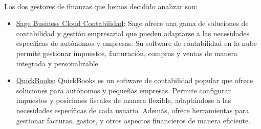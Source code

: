 \paragraph{}
Los dos gestores de finanzas que hemos decidido analizar son: 

\begin{itemize}
    \item \href{https://www.sage.com/es-es/software-contabilidad/}{Sage Business Cloud Contabilidad}: Sage ofrece una gama de soluciones de contabilidad y gestión empresarial que pueden adaptarse a las necesidades específicas de autónomos y empresas. Su software de contabilidad en la nube permite gestionar impuestos, facturación, compras y ventas de manera integrada y personalizable.

    \item \href{https://quickbooks.intuit.com/es/}{QuickBooks}: QuickBooks es un software de contabilidad popular que ofrece soluciones para autónomos y pequeñas empresas. Permite configurar impuestos y posiciones fiscales de manera flexible, adaptándose a las necesidades específicas de cada usuario. Además, ofrece herramientas para gestionar facturas, gastos, y otros aspectos financieros de manera eficiente.
\end{itemize}

